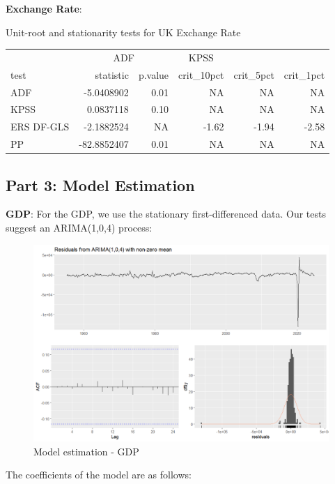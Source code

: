 \documentclass[
]{article}
\begin{document}
\textbf{Exchange Rate}:

\bgroup \table[H]
\centering
\caption{\label{tab:unnamed-chunk-7}Unit-root and stationarity tests for UK Exchange Rate}
\centering
\begin{tabular}[t]{lrrrrr}
\toprule
\multicolumn{1}{c}{ } & \multicolumn{2}{c}{ADF} & \multicolumn{1}{c}{KPSS} \\
\cmidrule(l{3pt}r{3pt}){2-3} \cmidrule(l{3pt}r{3pt}){4-4}
test & statistic & p.value & crit\_10pct & crit\_5pct & crit\_1pct\\
\midrule
ADF & -5.0408902 & 0.01 & NA & NA & NA\\
KPSS & 0.0837118 & 0.10 & NA & NA & NA\\
ERS DF-GLS & -2.1882524 & NA & -1.62 & -1.94 & -2.58\\
PP & -82.8852407 & 0.01 & NA & NA & NA\\
\bottomrule
\end{tabular}
\endtable\egroup

\subsection*{Part 3: Model Estimation}

\textbf{GDP}: For the GDP, we use the stationary first-differenced data.
Our tests suggest an ARIMA(1,0,4) process:

\begin{figure}

{\centering \includegraphics[width=0.8\linewidth]{../results/GDP (first-differenced)_residuals} 

}

\caption{Model estimation - GDP}\label{fig:unnamed-chunk-8}
\end{figure}

The coefficients of the model are as follows:
\end{document}
